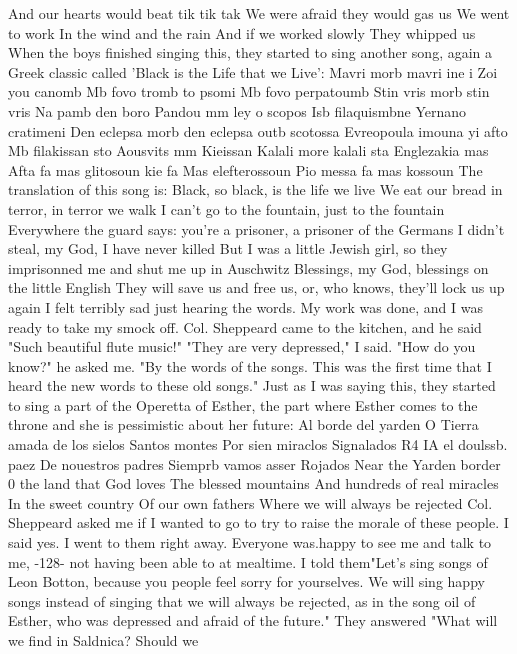 And our hearts would beat tik tik tak 
We were afraid they would gas us 
We went to work 
In the wind and the rain 
And if we worked slowly 
They whipped us 
When the boys finished singing this, they started to sing another song, again a 
Greek classic called 'Black is the Life that we Live': 
Mavri morb mavri ine i Zoi you canomb 
Mb fovo tromb to psomi 
Mb fovo perpatoumb 
Stin vris morb stin vris 
Na pamb den boro 
Pandou mm ley o scopos 
Isb filaquismbne 
Yernano cratimeni 
Den eclepsa morb den eclepsa 
outb scotossa 
Evreopoula imouna yi afto 
Mb filakissan sto 
Aousvits mm Kieissan 
Kalali more kalali sta 
Englezakia mas 
Afta fa mas glitosoun kie fa 
Mas elefterossoun 
Pio messa fa mas kossoun 
The translation of this song is: 
Black, so black, is the life we live 
We eat our bread in terror, in terror we walk 
I can't go to the fountain, just to the fountain 
Everywhere the guard says: you're a prisoner, a 
prisoner of the Germans 
I didn't steal, my God, I have never killed 
But I was a little Jewish girl, so they imprisonned me 
and shut me up in Auschwitz 
Blessings, my God, blessings on the little English 
They will save us and free us, or, who knows, they'll 
lock us up again 
I felt terribly sad just hearing the words. My work was done, and I was ready to 
take my smock off. Col. Sheppeard came to the kitchen, and he said "Such beautiful 
flute music!" 
"They are very depressed," I said. 
"How do you know?" he asked me. 
"By the words of the songs. This was the first time that I heard the new words 
to these old songs." Just as I was saying this, they started to sing a part of the 
Operetta of Esther, the part where Esther comes to the throne and she is pessimistic 
about her future: 
Al borde del yarden 
O Tierra amada de los sielos 
Santos montes 
Por sien miraclos 
Signalados 
R4 IA el doulssb. paez 
De nouestros padres 
Siemprb vamos asser 
Rojados 
Near the Yarden border 
0 the land that God loves 
The blessed mountains 
And hundreds of real miracles 
In the sweet country 
Of our own fathers 
Where we will always be rejected 
Col. Sheppeard asked me if I wanted to go to try to raise the morale of these people. 
I said yes. I went to them right away. Everyone was.happy to see me and talk to me, 
-128- 
not having been able to at mealtime. I told them"Let's sing songs of Leon Botton, 
because you people feel sorry for yourselves. We will sing happy songs instead of 
singing that we will always be rejected, as in the song oil of Esther, who was depressed 
and afraid of the future." They answered "What will we find in Saldnica? Should we 

